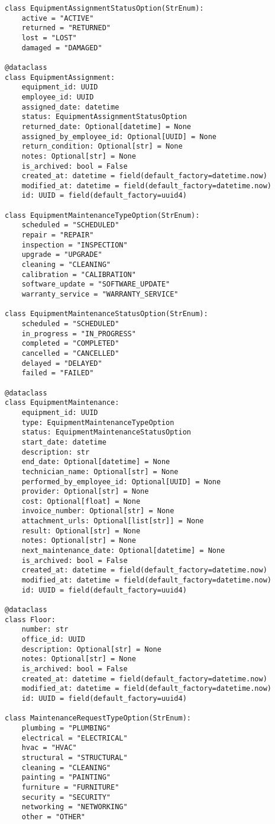 \begin{lstlisting}[style=pythonstyle]
class EquipmentAssignmentStatusOption(StrEnum):
    active = "ACTIVE"
    returned = "RETURNED"
    lost = "LOST"
    damaged = "DAMAGED"

@dataclass
class EquipmentAssignment:
    equipment_id: UUID
    employee_id: UUID
    assigned_date: datetime
    status: EquipmentAssignmentStatusOption
    returned_date: Optional[datetime] = None
    assigned_by_employee_id: Optional[UUID] = None
    return_condition: Optional[str] = None
    notes: Optional[str] = None
    is_archived: bool = False
    created_at: datetime = field(default_factory=datetime.now)
    modified_at: datetime = field(default_factory=datetime.now)
    id: UUID = field(default_factory=uuid4)

class EquipmentMaintenanceTypeOption(StrEnum):
    scheduled = "SCHEDULED"
    repair = "REPAIR"
    inspection = "INSPECTION"
    upgrade = "UPGRADE"
    cleaning = "CLEANING"
    calibration = "CALIBRATION"
    software_update = "SOFTWARE_UPDATE"
    warranty_service = "WARRANTY_SERVICE"

class EquipmentMaintenanceStatusOption(StrEnum):
    scheduled = "SCHEDULED"
    in_progress = "IN_PROGRESS"
    completed = "COMPLETED"
    cancelled = "CANCELLED"
    delayed = "DELAYED"
    failed = "FAILED"

@dataclass
class EquipmentMaintenance:
    equipment_id: UUID
    type: EquipmentMaintenanceTypeOption
    status: EquipmentMaintenanceStatusOption
    start_date: datetime
    description: str
    end_date: Optional[datetime] = None
    technician_name: Optional[str] = None
    performed_by_employee_id: Optional[UUID] = None
    provider: Optional[str] = None
    cost: Optional[float] = None
    invoice_number: Optional[str] = None
    attachment_urls: Optional[list[str]] = None
    result: Optional[str] = None
    notes: Optional[str] = None
    next_maintenance_date: Optional[datetime] = None
    is_archived: bool = False
    created_at: datetime = field(default_factory=datetime.now)
    modified_at: datetime = field(default_factory=datetime.now)
    id: UUID = field(default_factory=uuid4)

@dataclass
class Floor:
    number: str
    office_id: UUID
    description: Optional[str] = None
    notes: Optional[str] = None
    is_archived: bool = False
    created_at: datetime = field(default_factory=datetime.now)
    modified_at: datetime = field(default_factory=datetime.now)
    id: UUID = field(default_factory=uuid4)

class MaintenanceRequestTypeOption(StrEnum):
    plumbing = "PLUMBING"
    electrical = "ELECTRICAL"
    hvac = "HVAC"
    structural = "STRUCTURAL"
    cleaning = "CLEANING"
    painting = "PAINTING"
    furniture = "FURNITURE"
    security = "SECURITY"
    networking = "NETWORKING"
    other = "OTHER"


\end{lstlisting}
